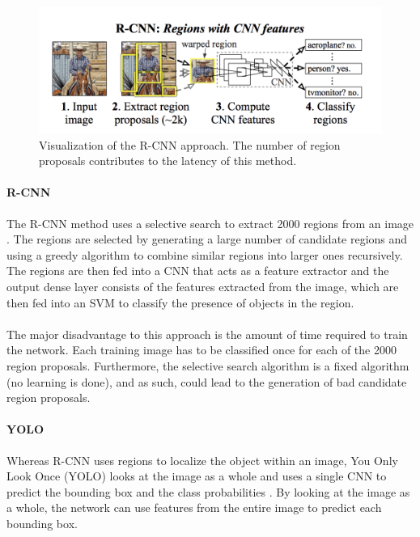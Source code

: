 \begin{figure}[ht]
	\centering
	\includegraphics[width=.9\linewidth]{img/chapter2_background/rcnn.png}
	\caption{Visualization of the R-CNN approach. The number of region proposals contributes to the latency of this method.}
\end{figure}

\paragraph{R-CNN} The R-CNN method uses a selective search to extract 2000 regions from an image \cite{Girshick2014}. The regions are selected by generating a large number of candidate regions and using a greedy algorithm to combine similar regions into larger ones recursively. The regions are then fed into a CNN that acts as a feature extractor and the output dense layer consists of the features extracted from the image, which are then fed into an SVM to classify the presence of objects in the region.

\paragraph{}The major disadvantage to this approach is the amount of time required to train the network. Each training image has to be classified once for each of the 2000 region proposals. Furthermore, the selective search algorithm is a fixed algorithm (no learning is done), and as such, could lead to the generation of bad candidate region proposals.

\paragraph{YOLO} \label{sec:backYOLO} Whereas R-CNN uses regions to localize the object within an image, You Only Look Once (YOLO) looks at the image as a whole and uses a single CNN to predict the bounding box and the class probabilities \cite{Redmon}. By looking at the image as a whole, the network can use features from the entire image to predict each bounding box.

